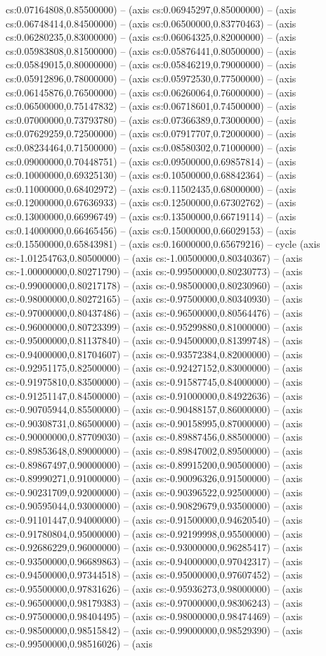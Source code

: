 cs:0.07164808,0.85500000) -- (axis cs:0.06945297,0.85000000) -- (axis cs:0.06748414,0.84500000) -- (axis cs:0.06500000,0.83770463) -- (axis cs:0.06280235,0.83000000) -- (axis cs:0.06064325,0.82000000) -- (axis cs:0.05983808,0.81500000) -- (axis cs:0.05876441,0.80500000) -- (axis cs:0.05849015,0.80000000) -- (axis cs:0.05846219,0.79000000) -- (axis cs:0.05912896,0.78000000) -- (axis cs:0.05972530,0.77500000) -- (axis cs:0.06145876,0.76500000) -- (axis cs:0.06260064,0.76000000) -- (axis cs:0.06500000,0.75147832) -- (axis cs:0.06718601,0.74500000) -- (axis cs:0.07000000,0.73793780) -- (axis cs:0.07366389,0.73000000) -- (axis cs:0.07629259,0.72500000) -- (axis cs:0.07917707,0.72000000) -- (axis cs:0.08234464,0.71500000) -- (axis cs:0.08580302,0.71000000) -- (axis cs:0.09000000,0.70448751) -- (axis cs:0.09500000,0.69857814) -- (axis cs:0.10000000,0.69325130) -- (axis cs:0.10500000,0.68842364) -- (axis cs:0.11000000,0.68402972) -- (axis cs:0.11502435,0.68000000) -- (axis cs:0.12000000,0.67636933) -- (axis cs:0.12500000,0.67302762) -- (axis cs:0.13000000,0.66996749) -- (axis cs:0.13500000,0.66719114) -- (axis cs:0.14000000,0.66465456) -- (axis cs:0.15000000,0.66029153) -- (axis cs:0.15500000,0.65843981) -- (axis cs:0.16000000,0.65679216) -- cycle (axis cs:-1.01254763,0.80500000) -- (axis cs:-1.00500000,0.80340367) -- (axis cs:-1.00000000,0.80271790) -- (axis cs:-0.99500000,0.80230773) -- (axis cs:-0.99000000,0.80217178) -- (axis cs:-0.98500000,0.80230960) -- (axis cs:-0.98000000,0.80272165) -- (axis cs:-0.97500000,0.80340930) -- (axis cs:-0.97000000,0.80437486) -- (axis cs:-0.96500000,0.80564476) -- (axis cs:-0.96000000,0.80723399) -- (axis cs:-0.95299880,0.81000000) -- (axis cs:-0.95000000,0.81137840) -- (axis cs:-0.94500000,0.81399748) -- (axis cs:-0.94000000,0.81704607) -- (axis cs:-0.93572384,0.82000000) -- (axis cs:-0.92951175,0.82500000) -- (axis cs:-0.92427152,0.83000000) -- (axis cs:-0.91975810,0.83500000) -- (axis cs:-0.91587745,0.84000000) -- (axis cs:-0.91251147,0.84500000) -- (axis cs:-0.91000000,0.84922636) -- (axis cs:-0.90705944,0.85500000) -- (axis cs:-0.90488157,0.86000000) -- (axis cs:-0.90308731,0.86500000) -- (axis cs:-0.90158995,0.87000000) -- (axis cs:-0.90000000,0.87709030) -- (axis cs:-0.89887456,0.88500000) -- (axis cs:-0.89853648,0.89000000) -- (axis cs:-0.89847002,0.89500000) -- (axis cs:-0.89867497,0.90000000) -- (axis cs:-0.89915200,0.90500000) -- (axis cs:-0.89990271,0.91000000) -- (axis cs:-0.90096326,0.91500000) -- (axis cs:-0.90231709,0.92000000) -- (axis cs:-0.90396522,0.92500000) -- (axis cs:-0.90595044,0.93000000) -- (axis cs:-0.90829679,0.93500000) -- (axis cs:-0.91101447,0.94000000) -- (axis cs:-0.91500000,0.94620540) -- (axis cs:-0.91780804,0.95000000) -- (axis cs:-0.92199998,0.95500000) -- (axis cs:-0.92686229,0.96000000) -- (axis cs:-0.93000000,0.96285417) -- (axis cs:-0.93500000,0.96689863) -- (axis cs:-0.94000000,0.97042317) -- (axis cs:-0.94500000,0.97344518) -- (axis cs:-0.95000000,0.97607452) -- (axis cs:-0.95500000,0.97831626) -- (axis cs:-0.95936273,0.98000000) -- (axis cs:-0.96500000,0.98179383) -- (axis cs:-0.97000000,0.98306243) -- (axis cs:-0.97500000,0.98404495) -- (axis cs:-0.98000000,0.98474469) -- (axis cs:-0.98500000,0.98515842) -- (axis cs:-0.99000000,0.98529390) -- (axis cs:-0.99500000,0.98516026) -- (axis 